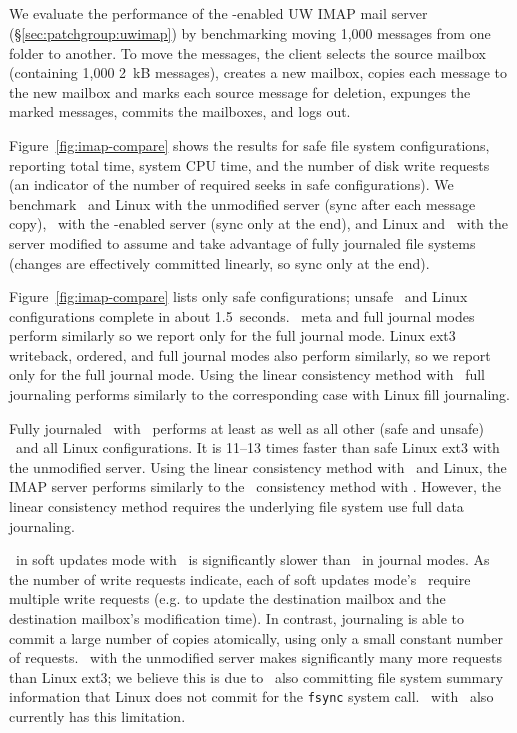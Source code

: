 \subsection {\Patchgroups}
\label{sec:evaluation:uwimap}


We evaluate the performance of the \patchgroup-enabled UW IMAP mail
server (\S\ref{sec:patchgroup:uwimap}) by benchmarking moving 1,000
messages from one folder to another.
%
To move the messages, the client selects the source mailbox (containing
1,000 2~kB messages), creates a new mailbox, copies each message to
the new mailbox and marks each source message for deletion, expunges
the marked messages, commits the mailboxes, and logs out.

Figure~\ref{fig:imap-compare} shows the results for safe file system
configurations,
%
reporting total time, system CPU time, and the number of disk write
requests (an indicator of the number of required seeks in safe
configurations).
%
We benchmark
%
\Kudos\ and Linux with the unmodified server (sync after each message
copy),
%
\Kudos\ with the \patchgroup-enabled server (sync only at the end),
%
and Linux and \Kudos\ with the server modified to assume and take
advantage of fully journaled file systems (changes are effectively
committed linearly, so sync only at the end).

Figure~\ref{fig:imap-compare} lists only safe configurations; unsafe
\Kudos\ and Linux configurations complete in about 1.5~seconds.
%
\Kudos\ meta and full journal modes perform similarly so we report
only for the full journal mode.
%
Linux ext3 writeback, ordered, and full journal modes also perform similarly,
so we report only for the full journal mode.
%
Using the linear consistency method with \Kudos\ full journaling performs
similarly to the corresponding case with Linux fill journaling.

Fully journaled \Kudos\ with \patchgroups\ performs at least as well
as all other (safe and unsafe) \Kudos\ and all Linux configurations.
It is 11--13 times faster than safe Linux ext3 with the unmodified
server.
%
Using the linear consistency method with \Kudos\ and Linux, the IMAP
server performs similarly to the \patchgroup\ consistency method with
\Kudos. However, the linear consistency method requires the underlying
file system use full data journaling.

\Kudos\ in soft updates mode with \patchgroups\ is significantly
slower than \Kudos\ in journal modes. As the number of write requests
indicate, each of soft updates mode's \patchgroups\ require multiple
write requests (e.g. to update the destination mailbox and the
destination mailbox's modification time). In contrast, journaling is
able to commit a large number of copies atomically, using only a small
constant number of requests.
%
\Kudos\ with the unmodified server makes significantly many more
requests than Linux ext3; we believe this is due to \Kudos\ also
committing file system summary information that Linux does not commit
for the \texttt{fsync} system call. \Kudos\ with \patchgroups\
also currently has this limitation.

